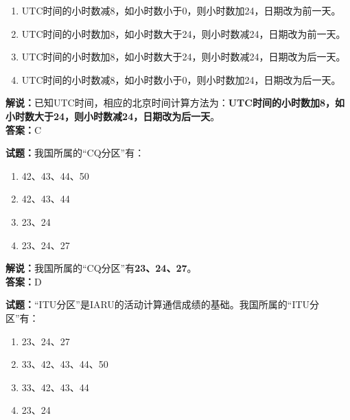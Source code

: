 \documentclass{ctexbook}
\begin{document}
\begin{enumerate}[leftmargin=3em]
  \item UTC时间的小时数减8，如小时数小于0，则小时数加24，日期改为前一天。
  \item UTC时间的小时数加8，如小时数大于24，则小时数减24，日期改为前一天。
  \item UTC时间的小时数加8，如小时数大于24，则小时数减24，日期改为后一天。
  \item UTC时间的小时数减8，如小时数小于0，则小时数加24，日期改为后一天。
\end{enumerate}

\noindent\textbf{解说：}已知UTC时间，相应的北京时间计算方法为：\textbf{UTC时间的小时数加8，如小时数大于24，则小时数减24，日期改为后一天}。\\\noindent\textbf{答案：}C

\bigskip

\noindent\textbf{试题：}我国所属的“CQ分区”有：

\begin{enumerate}[leftmargin=3em]
  \item 42、43、44、50
  \item 42、43、44
  \item 23、24
  \item 23、24、27
\end{enumerate}

\noindent\textbf{解说：}我国所属的“CQ分区”有\textbf{23、24、27}。\\\noindent\textbf{答案：}D

\bigskip

\noindent\textbf{试题：}“ITU分区”是IARU的活动计算通信成绩的基础。我国所属的“ITU分区”有：

\begin{enumerate}[leftmargin=3em]
  \item 23、24、27
  \item 33、42、43、44、50
  \item 33、42、43、44
  \item 23、24
\end{enumerate}
\end{document}
